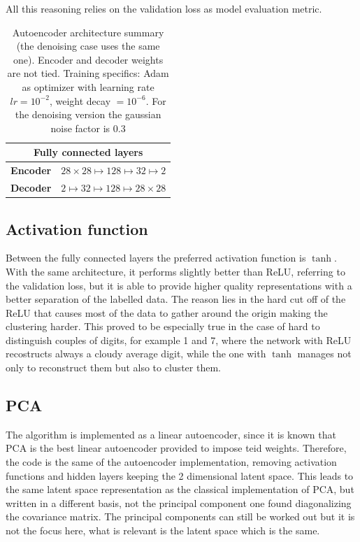 \documentclass[twocolumn,gsifonts,twoside]{gsipaper}
\begin{document}
All this reasoning relies on the validation loss as model evaluation metric. 

\begin{table}
  \centering
  \begin{tabular}{c c}
    \toprule
    \multicolumn{2}{c}{Fully connected layers} \\ 
    \midrule
    \textbf{Encoder} & $28\times28 \mapsto 128 \mapsto 32 \mapsto 2$ \\
    \textbf{Decoder} & $2 \mapsto 32 \mapsto 128 \mapsto 28\times28$ \\
    \bottomrule
  \end{tabular}
  \caption{Autoencoder architecture summary (the denoising case uses the same one). Encoder and decoder weights are not tied. Training specifics: Adam as optimizer with learning rate $lr=10^{-2}$, weight decay $=10^{-6}$. For the denoising version the gaussian noise factor is 0.3}
  \label{tab:architecture}
\end{table}


\subsection{Activation function}
Between the fully connected layers the preferred activation function is $\tanh$. With the same architecture, it performs slightly better than ReLU, referring to the validation loss, but it is able to provide higher quality representations with a better separation of the labelled data. The reason lies in the hard cut off of the ReLU that causes most of the data to gather around the origin making the clustering harder. This proved to be especially true in the case of hard to distinguish couples of digits, for example 1 and 7, where the network with ReLU recostructs always a cloudy average digit, while the one with $\tanh$ manages not only to reconstruct them but also to cluster them.

\subsection{PCA}
The algorithm is implemented as a linear autoencoder, since it is known that PCA is the best linear autoencoder provided to impose teid weights. Therefore, the code is the same of the autoencoder implementation, removing activation functions and hidden layers keeping the 2 dimensional latent space. This leads to the same latent space representation as the classical implementation of PCA, but written in a different basis, not the principal component one found diagonalizing the covariance matrix. The principal components can still be worked out \cite{Plaut2018} but it is not the focus here, what is relevant is the latent space which is the same.
\end{document}
